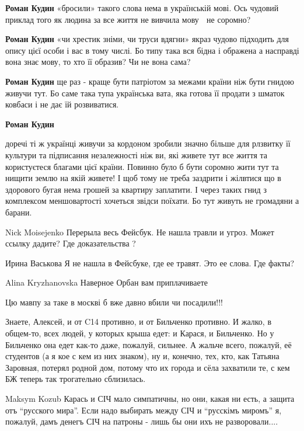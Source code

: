 \begin{itemize}
\textbf{Роман Кудин} «бросили» такого слова нема в українській мові.
Ось чудовий приклад того як людина за все життя не вивчила мову 🙂 не соромно?

\textbf{Роман Кудин} «чи хрестик зніми, чи труси вдягни» якраз чудово підходить
для опису цієї особи і вас в тому числі.  Бо типу така вся бідна і ображена а
насправді вона знає мову, то хто її образив? Чи не вона сама?

\textbf{Роман Кудин} ще раз - краще бути патріотом за межами країни ніж бути
гнидою живучи тут. Бо саме така тупа українська вата, яка готова її продати з
шматок ковбаси і не дає їй розвиватися.

\textbf{Роман Кудин} 

\obeycr
доречі ті ж українці живучи за кордоном зробили значно більше для рлзвитку її культури та підписання незалежності ніж ви, які живете тут все життя та користуєтеся благами цієї країни. Повинно було б бути соромно жити тут та нищити землю на якій живете!
І щоб тому не треба заздрити і жілвтися що в здорового бугая нема грошей за квартиру заплатити.
І через таких гнид з комплексом меншовартості хочеться звідси поїхати. Бо тут живуть не громадяни а барани.
\restorecr

Nick Moisejenko Перерыла весь Фейсбук. Не нашла травли и угроз. Может ссылку дадите? Где доказательства ?

Ирина Васькова Я не нашла в Фейсбуке, где ее травят. Это ее слова. Где факты?

Alina Kryzhanovska Наверное Орбан вам приплачиваете

Цю мавпу за таке в москві б вже давно вбили чи посадили!!!


Знаете, Алексей, и от C14 противно, и от Бильченко противно. И жалко, в
общем-то, всех людей, у которых крыша едет: и Карася, и Бильченко. Но у
Бильченко она едет как-то даже, пожалуй, сильнее.  А жальче всего, пожалуй, её
студентов (а я кое с кем из них знаком), ну и, конечно, тех, кто, как Татьяна
Заровная, потерял родной дом, потому что их города и сёла захватили те, с кем
БЖ теперь так трогательно сблизилась.


Maksym Kozub Карась и СІЧ мало симпатичны, но они, какая ни есть, а защита отъ
\enquote{русского мира}. Если надо выбирать между СІЧ и \enquote{русскімъ миромъ} я, пожалуй,
дамъ денегъ СІЧ на патроны - лишь бы они ихъ не разворовали....


\end{itemize}
